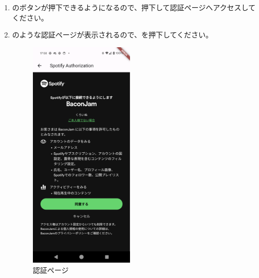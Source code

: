 \begin{enumerate}
            \newpage
            \item {}のボタンが押下できるようになるので、押下して認証ページへアクセスしてください。
            \item {}のような認証ページが表示されるので、を押下してください。
                \begin{figure}[htbp]
                    \centering
                    \includegraphics[width=5cm]{./pictures/Spotify13.png}
                    \caption{認証ページ}
                    \label{img:spotify13}
                \end{figure}


\end{enumerate}
